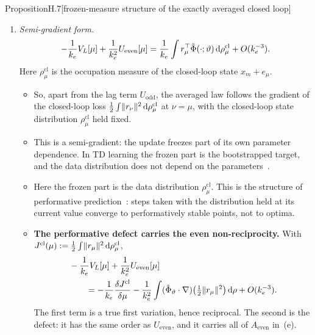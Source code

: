 \begin{thm}{Proposition}{H.7}[frozen-measure structure of the exactly averaged closed loop]
\begin{enumerate}[label=(\alph*)]
  \item \emph{Semi-gradient form.}
    \begin{equation}\label{eq:finitegain:semigrad}
      -\frac{1}{k_e}V_L[\mu] + \frac{1}{k_e^2}U_{\mathrm{even}}[\mu]
        = \frac{1}{k_e}\int r_\mu^\top\tilde\Phi(\cdot;\vartheta)\,\mathrm{d}\rho^{\mathrm{cl}}_\mu + O(k_e^{-3}).
    \end{equation}
    Here $\rho^{\mathrm{cl}}_\mu$ is the occupation measure of the closed-loop state $x_m+e_\mu$.
    \begin{itemize}
      \item So, apart from the lag term $U_{\mathrm{odd}}$, the averaged law follows the gradient of the closed-loop
        loss $\frac12\int\lVert r_\nu\rVert^2\,\mathrm{d}\rho^{\mathrm{cl}}_\mu$ at $\nu=\mu$, with the closed-loop state
        distribution $\rho^{\mathrm{cl}}_\mu$ held fixed.
      \item This is a semi-gradient: the update freezes part of its own parameter dependence. In TD learning the
        frozen part is the bootstrapped target, and the data distribution does not depend on the
        parameters~\cite{S11,S10}.
      \item Here the frozen part is the data distribution $\rho^{\mathrm{cl}}_\mu$. This is the structure of
        performative prediction~\cite{S14}: steps taken with the distribution held at its current value converge to
        performatively stable points, not to optima.
      \item \textbf{The performative defect carries the even non-reciprocity.} With
        $J^{\mathrm{cl}}(\mu) := \frac12\int\lVert r_\mu\rVert^2\,\mathrm{d}\rho^{\mathrm{cl}}_\mu$,
        \begin{equation}\label{eq:finitegain:defect}
          \begin{aligned}
            &-\frac{1}{k_e}V_L[\mu] + \frac{1}{k_e^2}U_{\mathrm{even}}[\mu]\\
            &\qquad= -\frac{1}{k_e}\frac{\delta J^{\mathrm{cl}}}{\delta\mu}
              - \frac{1}{k_e^2}\int(\tilde\Phi_\vartheta\cdot\nabla)\bigl(\tfrac12\lVert r_\mu\rVert^2\bigr)\,\mathrm{d}\rho
              + O(k_e^{-3}).
          \end{aligned}
        \end{equation}
        The first term is a true first variation, hence reciprocal. The second is the defect: it has the same order
        as $U_{\mathrm{even}}$, and it carries all of $A_{\mathrm{even}}$ in~(e).
    \end{itemize}


\end{enumerate}
\end{thm}
